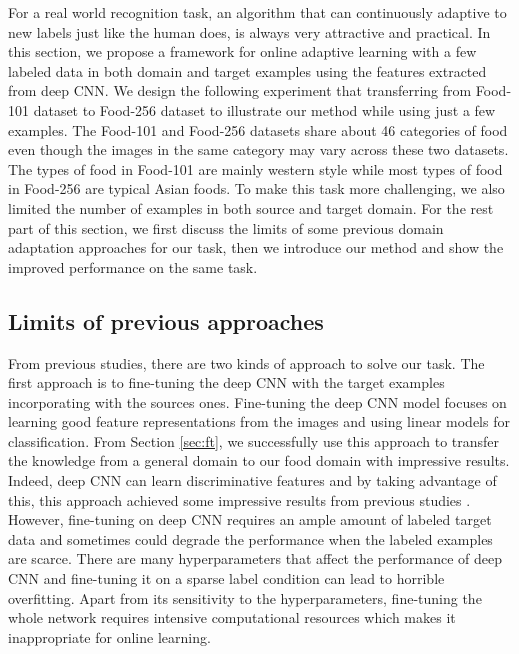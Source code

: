 ﻿For a real world recognition task, an algorithm that can continuously adaptive to new labels just like the human does, is always very attractive and practical.
In this section, we propose a framework for online adaptive learning with a few labeled data in both domain and target examples using the features extracted from deep CNN.  We design the following experiment that transferring from Food-101 dataset to Food-256 dataset to illustrate our method while using just a few examples. %
The Food-101 and Food-256 datasets share about 46 categories of food even though the images in the same category may vary across these two datasets. The types of food in Food-101 are mainly western style while most types of food in Food-256 are typical Asian foods. To make this task more challenging, we also limited the number of examples in both source and target domain. For the rest part of this section, we first discuss the limits of some previous domain adaptation approaches for our task, then we introduce our method and show the improved performance on the same task.
\subsection{Limits of previous approaches}
From previous studies, there are two kinds of approach to solve our task. The first approach is to fine-tuning the deep CNN with the target examples incorporating with the sources ones.
Fine-tuning the deep CNN model focuses on learning good feature representations from the images and using linear models for classification. From Section \ref{sec:ft}, we successfully use this approach to transfer the knowledge from a general domain to our food domain with impressive results. Indeed, deep CNN can learn discriminative features and by taking advantage of this, this approach achieved some impressive results from previous studies\cite{Chatfield14} \cite{zeiler2014visualizing}. However, fine-tuning on deep CNN requires an ample amount of labeled target data and sometimes could degrade the performance when the labeled examples are scarce\cite{hoffman2013one}. There are many hyperparameters that affect the performance of deep CNN and fine-tuning it on a sparse label condition can lead to horrible overfitting. Apart from its sensitivity to the hyperparameters, fine-tuning the whole network requires intensive computational resources which makes it inappropriate for online learning.

